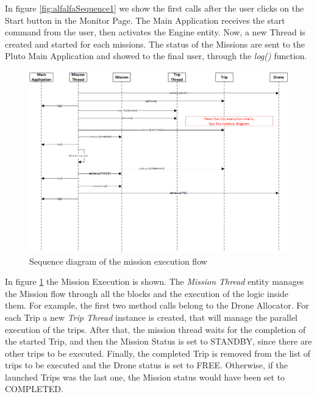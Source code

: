In figure \ref{fig:alfalfaSequence1} we show the first calls after the user clicks on the Start button in the Monitor Page.
The Main Application receives the start command from the user, then activates the Engine entity. Now, a new Thread is created and started for each missions. The status of the Missions are sent to the Pluto Main Application and showed to the final user, through the \textit{log()} function.
\\

\begin{figure}[H]
  \centering
  \includegraphics[width=\linewidth]{pictures/Alfalfa_Sequence_MissionExecution.png}
  \caption{Sequence diagram of the mission execution flow}
  \label{fig:alfalfaSequence2}
\end{figure}

In figure \ref{fig:alfalfaSequence2} the Mission Execution is shown.
The \textit{Mission Thread} entity manages the Mission flow through all the blocks and the execution of the logic inside them.
For example, the first two method calls belong to the Drone Allocator. 
For each Trip a new \textit{Trip Thread} instance is created, that will manage the parallel execution of the trips.
After that, the mission thread waits for the completion of the started Trip, and then the Mission Status is set to STANDBY, since there are other trips to be executed.
Finally, the completed Trip is removed from the list of trips to be executed and the Drone status is set to FREE.
Otherwise, if the launched Trips was the last one, the Mission status would have been set to COMPLETED.
\\

